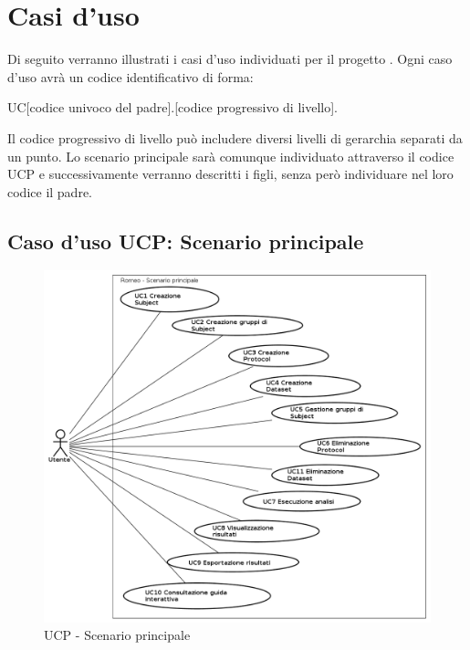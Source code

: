 \section{Casi d'uso}
Di seguito verranno illustrati i casi d'uso\glossario{} individuati per il progetto \project{}.
Ogni caso d'uso\glossario{} avrà un codice identificativo di forma:
\begin{center}
UC[codice univoco del padre].[codice progressivo di livello].
\end{center}
Il codice progressivo di livello può includere diversi livelli di gerarchia separati da un punto. Lo scenario principale sarà comunque individuato attraverso il codice UCP e successivamente verranno descritti i figli, senza però individuare nel loro codice il padre.

\subsection{Caso d'uso UCP: Scenario principale}

\begin{figure}[!h]
\begin{center}
\includegraphics[scale=0.5]{./img/Use_Case/UCP}
\caption{UCP - Scenario principale}
\end{center}
\end{figure}

